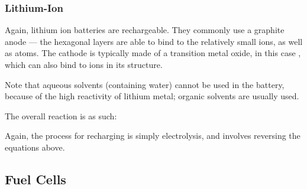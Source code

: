 


			\subsubsection{Lithium-Ion}

				Again, lithium ion batteries are rechargeable. They commonly use a graphite anode --- the hexagonal layers are able to bind
				to the relatively small  ions, as well as  atoms. The cathode is typically made of a transition metal oxide,
				in this case , which can also bind to  ions in its structure.

				Note that aqueous solvents (containing water) cannot be used in the battery, because of the high reactivity of lithium metal;
				organic solvents are usually used.


				The overall reaction is as such:


				Again, the process for recharging is simply electrolysis, and involves reversing the equations above.






		\pagebreak
		\subsection{Fuel Cells}

